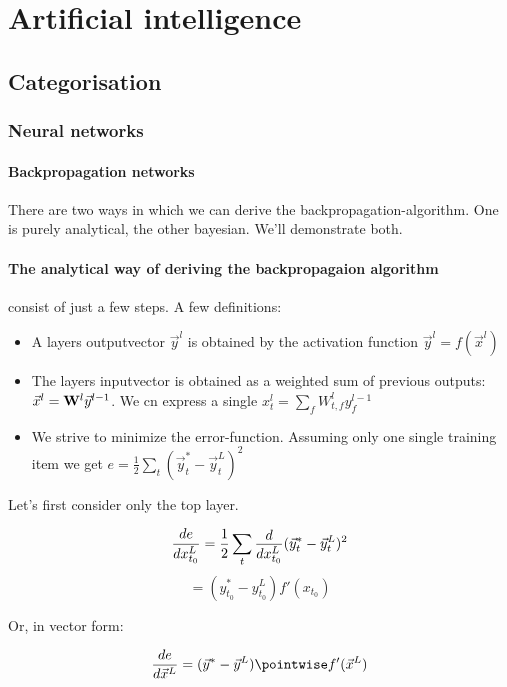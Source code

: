 \section{Artificial intelligence}

\subsection{Categorisation}

\subsubsection{Neural networks}

\paragraph{Backpropagation networks}

There are two ways in which we can derive the backpropagation-algorithm. One is purely analytical, the other bayesian. We'll demonstrate both. 

\paragraph{The analytical way of deriving the backpropagaion algorithm} consist of just a few steps. 
A few definitions: 

\begin{itemize}
	\item A layers outputvector $\vec{y}^l$ is obtained by the activation function $\vec{y}^l = f(\vec{x}^l) $
	\item The layers inputvector is obtained as a weighted sum of previous outputs: $\vec{x}^l = \mathbf{W}^l \vec{y}^{l-1} $. We cn express a single $x_t^l = \sum_f W_{t,f}^l y_f^{l-1}$
	\item We strive to minimize the error-function. Assuming only one single training item we get $e = \frac{1}{2} \sum_t (\vec{y}^*_t - \vec{y}^L_t)^2 $
\end{itemize}

Let's first consider only the top layer. 

$$   \frac{ \mathop{de} }{ \mathop{dx_{t_0}^L} }  = \frac{1}{2} \sum_t  \frac{ \mathop{d} }{ \mathop{dx_{t_0}^L} }  (\vec{y}^*_t - \vec{y}^L_t)^2 $$
$$ = (y_{t_0}^* - y_{t_0}^L) f'(x_{t_0}) $$

Or, in vector form: 

$$ \partDiff{e}{\vec{x}^L} = (\vec{y}^* - \vec{y}^L) \pointwise f'(\vec{x}^L)  $$


